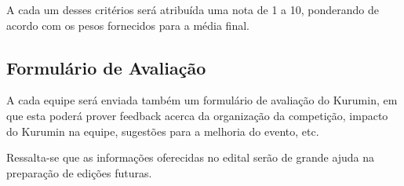         A cada um desses critérios será atribuída uma nota de 1 a 10, ponderando de acordo com os pesos fornecidos para a média final.

    \subsection{Formulário de Avaliação}
        A cada equipe será enviada também um formulário de avaliação do Kurumin, em que esta poderá prover feedback acerca da organização da competição, impacto do Kurumin na equipe, sugestões para a melhoria do evento, etc.

        Ressalta-se que as informações oferecidas no edital serão de grande ajuda na preparação de edições futuras.